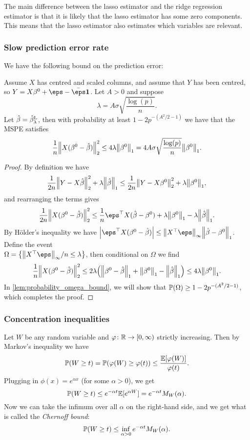 The main difference between the lasso estimator and the ridge regression estimator is that it is likely that the lasso estimator has some zero components. This means that the lasso estimator also estimates which variables are relevant. 

\subsubsection{Slow prediction error rate}
We have the following bound on the prediction error:
\begin{theorem} \label{thm:lasso_slow_rate}
	Assume $X$ has centred and scaled columns, and assume that $Y$ has been centred, so $Y = X\beta^0 + \eps - \bar\eps \vec 1$. Let $A > 0$ and suppose
	\[
	\lambda = A\sigma\sqrt{\frac{\log(p)}{n}}.
	\]
	Let $\hat\beta = \hat\beta_\lambda^\mathrm{L}$, then with probability at least $1 - 2p^{-(A^2/2 - 1)}$ we have that the MSPE satisfies
	\[
	\frac1n \norm{X(\beta^0 - \hat\beta)}_2^2 \leq 4\lambda \norm{\beta^0}_1 = 4A\sigma\sqrt{\frac{\log(p)}{n}} \norm{\beta^0}_1. 
	\]
\end{theorem}

\begin{proof}
	By definition we have
	\[
	\frac1{2n}\norm{Y - X\hat\beta }_2^2 + \lambda \norm{\hat \beta}_1 \leq \frac1{2n}\norm{Y - X\beta^0}_2^2 + \lambda \norm{\beta^0}_1,
	\]
	and rearranging the terms gives
	\[
	\frac1{2n} \norm{X(\beta^0 - \hat\beta)}_2^2 \leq\frac1n \eps\T X (\hat\beta - \beta^0) + \lambda\norm{\beta^0}_1 - \lambda \norm{\hat\beta}_1. 
	\]
	By H\"older's inequality we have $\abs{\eps\T X(\beta^0 - \hat\beta)} \leq \norm{X\T\eps}_\infty \norm{\hat\beta - \beta^0}_1$. 
	Define the event \\ $\Omega = \qty{\norm{X\T\eps}_\infty/n \leq \lambda}$, then conditional on $\Omega$ we find
	\[
	\frac1{n} \norm{X(\beta^0 - \hat\beta)}_2^2 \leq 2\lambda \qty(\norm{\beta^0 - \hat\beta}_1 + \norm{\beta^0}_1 - \norm{\hat\beta}_1) \leq 4\lambda \norm{\beta^0}_1.
	\]
	In \cref{lem:probability_omega_bound}, we will show that $\mathbb P(\Omega) \geq 1 - 2p^{-(A^2/2 - 1)}$, which completes the proof. 
\end{proof}

\subsubsection{Concentration inequalities}
Let $W$ be any random variable and $\varphi \colon \mathbb R\to[0,\infty)$ strictly increasing. Then by Markov's inequality we have
\[
\mathbb P(W \geq t) = \mathbb P(\varphi(W) \geq \varphi(t)) \leq \frac{\mathbb E[\varphi(W)]}{\varphi(t)}. 
\]
Plugging in $\phi(x) = e^{\alpha x}$ (for some $\alpha > 0$), we get
\[
\mathbb P(W \geq t) \leq e^{-\alpha t} \mathbb E[e^{\alpha W}] = e^{-\alpha t} M_W(\alpha).
\]
Now we can take the infimum over all $\alpha$ on the right-hand side, and we get what is called the \emph{Chernoff bound}:
\[
\mathbb P(W \geq t) \leq \inf_{\alpha > 0} e^{-\alpha t} M_W(\alpha). 
\]

